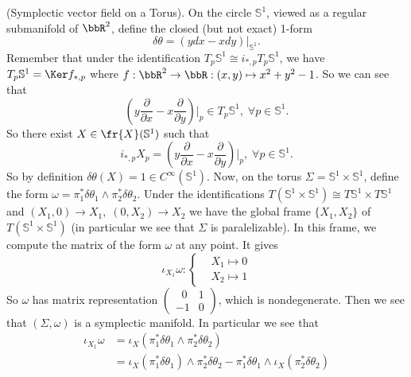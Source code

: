 \begin{example}
    (Symplectic vector field on a Torus).
 On the circle $\mathbb{S}^1$, viewed as a regular submanifold of $\bbR^2$, define the closed (but not exact) 1-form 
 \begin{equation}
    \delta\theta = (ydx-xdy)\big|_{\mathbb{S}^1}.
 \end{equation}
 Remember that under the identification $T_p\mathbb{S}^1\cong i_{*,p}T_p\mathbb{S}^1$, we have $T_p\mathbb{S}^1=\Ker f_{*,p}$
 where $f:\bbR^2\to\bbR:(x,y)\mapsto x^2+y^2-1$. So we can see that 
 \begin{equation}
    (y\frac{\partial}{\partial x}-x\frac{\partial}{\partial y})\bigg|_p\in T_p\mathbb{S}^1,\;\forall p\in \mathbb{S}^1.
 \end{equation}
 So there exist $X\in\fr{X}(\mathbb{S}^1)$ such that 
 \begin{equation}
    i_{*,p}X_p=(y\frac{\partial}{\partial x}-x\frac{\partial}{\partial y})\bigg|_p,\;\forall p\in\mathbb{S}^1.
 \end{equation}
 So by definition $\delta\theta(X)=1\in C^\infty(\mathbb{S}^1)$. Now, on the torus $\Sigma = \mathbb{S}^1\times \mathbb{S}^1$, define 
 the form $\omega=\pi_1^*\delta\theta_1\wedge\pi_2^*\delta\theta_2$. Under the identifications
 $T(\mathbb{S}^1\times\mathbb{S}^1)\cong T\mathbb{S}^1\times T\mathbb{S}^1$ and $(X_1,0)\to X_1,\;(0,X_2)\to X_2$ we have 
 the global frame   
 $\{X_1,X_2\}$ of $T(\mathbb{S}^1\times\mathbb{S}^1)$ (in particular we see that $\Sigma$ is paralelizable). 
 In this frame, we compute 
 the matrix of the form $\omega$ at any point. It gives 
 \begin{equation}
   \iota_{X_1}\omega:\left\{\begin{aligned}
        &X_1\mapsto 0\\
        &X_2\mapsto 1
    \end{aligned}\right.
 \end{equation}
 So $\omega$ has matrix representation 
 $\left(\begin{smallmatrix}\;\;0&1\\-1&0\end{smallmatrix}\right)$, which is nondegenerate. 
Then we see that $(\Sigma, \omega)$ is a symplectic manifold. In particular we see that 
\begin{equation}
    \begin{split}
         \iota_{X_1}\omega&=\iota_X(\pi_1^*\delta\theta_1\wedge\pi_2^*\delta\theta_2)\\
         &=\iota_X(\pi_1^*\delta\theta_1)\wedge\pi_2^*\delta\theta_2-\pi_1^*\delta\theta_1\wedge\iota_X(\pi_2^*\delta\theta_2)\\

\end{split}
\end{equation}
\end{example}
